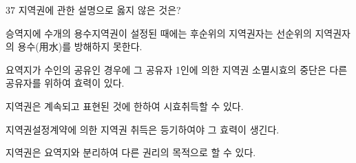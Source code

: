 \begin{question}{37}
지역권에 관한 설명으로 옳지 않은 것은?
\begin{choices}
  \item 승역지에 수개의 용수지역권이 설정된 때에는 후순위의 지역권자는 선순위의 지역권자의 용수(用水)를 방해하지 못한다.
  \item 요역지가 수인의 공유인 경우에 그 공유자 1인에 의한 지역권 소멸시효의 중단은 다른 공유자를 위하여 효력이 있다.
  \item 지역권은 계속되고 표현된 것에 한하여 시효취득할 수 있다.
  \item 지역권설정계약에 의한 지역권 취득은 등기하여야 그 효력이 생긴다.
  \item 지역권은 요역지와 분리하여 다른 권리의 목적으로 할 수 있다.
\end{choices}
\end{question}

